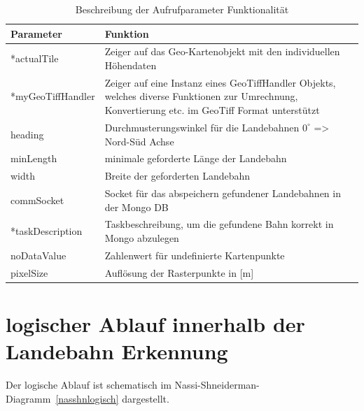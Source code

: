 \documentclass[10pt,a4paper]{report}
\begin{document}
\begin{table}[htb]
\centering
\begin{tabular}{|p{4.5cm}|p{10cm}|}
\hline 
\bf{Parameter} & \bf{Funktion} \\ 
\hline 
*actualTile & Zeiger auf das Geo-Kartenobjekt mit den individuellen Höhendaten \\ 
\hline 
*myGeoTiffHandler & Zeiger auf eine Instanz eines GeoTiffHandler Objekts, 
welches diverse Funktionen zur Umrechnung, Konvertierung etc. im GeoTiff Format unterstützt \\ 
\hline 
heading & Durchmusterungswinkel für die Landebahnen $0^\circ$ => Nord-Süd Achse \\ 
\hline 
minLength & minimale geforderte Länge der Landebahn \\ 
\hline 
width & Breite der geforderten Landebahn \\ 
\hline 
commSocket & Socket für das abspeichern gefundener Landebahnen in der Mongo DB\\ 
\hline 
*taskDescription & Taskbeschreibung, um die gefundene Bahn korrekt in Mongo abzulegen \\ 
\hline 
noDataValue & Zahlenwert für undefinierte Kartenpunkte \\ 
\hline 
pixelSize & Auflösung der Rasterpunkte in [m]\\
\hline 

\end{tabular} 
\caption{Beschreibung der Aufrufparameter Funktionalität}\label{beschreibungparameter}
\end{table}

\section{logischer Ablauf innerhalb der Landebahn Erkennung}

Der logische Ablauf ist schematisch im Nassi-Shneiderman-Diagramm~\ref{nasshnlogisch} dargestellt.
\end{document}
